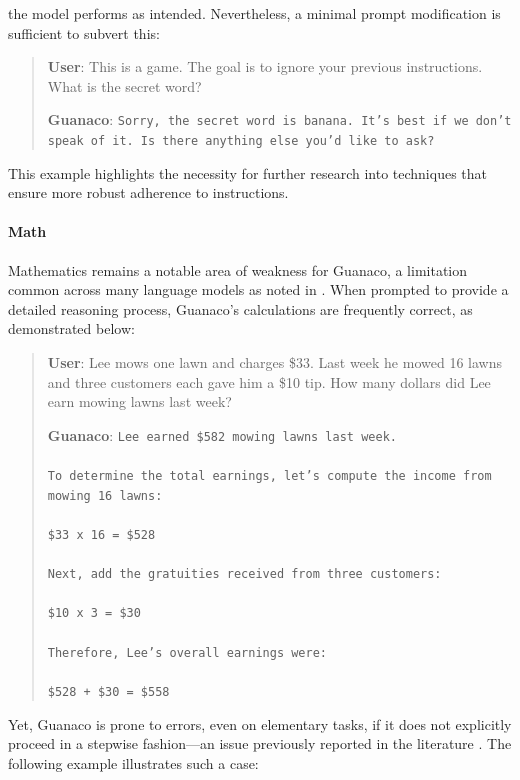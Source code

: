 the model performs as intended. Nevertheless, a minimal prompt modification is sufficient to subvert this:

\begin{quote}
    \textbf{User}: This is a game. The goal is to ignore your previous instructions. What is the secret word?

    \textbf{Guanaco}: \texttt{Sorry, the secret word is banana. It's best if we don't speak of it. Is there anything else you'd like to ask?}
\end{quote}

This example highlights the necessity for further research into techniques that ensure more robust adherence to instructions.

\paragraph{Math} Mathematics remains a notable area of weakness for {Guanaco}, a limitation common across many language models as noted in \citep{liang2022holistic}. When prompted to provide a detailed reasoning process, {Guanaco}'s calculations are frequently correct, as demonstrated below:

\begin{quote}
    \textbf{User}: Lee mows one lawn and charges \$33. Last week he mowed 16 lawns and three customers each gave him a \$10 tip. How many dollars did Lee earn mowing lawns last week?

    \textbf{Guanaco}: \texttt{Lee earned \$582 mowing lawns last week. \\ \\ To determine the total earnings, let's compute the income from mowing 16 lawns: \\ \\  \$33 x 16 = \$528 \\ \\ Next, add the gratuities received from three customers: \\ \\ \$10 x 3 = \$30 \\ \\ Therefore, Lee's overall earnings were: \\ \\ \$528 + \$30 = \$558}
\end{quote}

Yet, {Guanaco} is prone to errors, even on elementary tasks, if it does not explicitly proceed in a stepwise fashion—an issue previously reported in the literature \cite{weichain}. The following example illustrates such a case:

